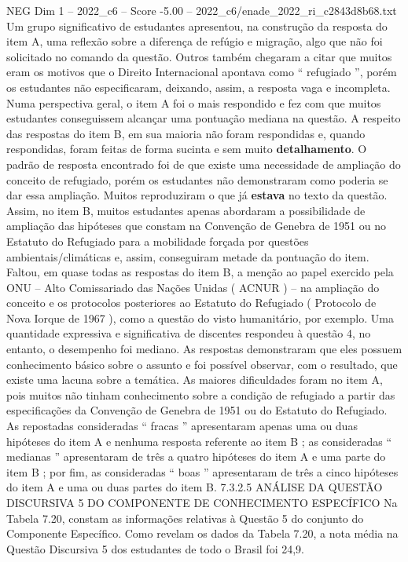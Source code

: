 \begin{textsample}{NEG Dim 1 – 2022\_c6 – Score -5.00 – 2022\_c6/enade\_2022\_ri\_c2843d8b68.txt}
Um grupo significativo de estudantes apresentou, na construção da resposta do item A, uma reflexão sobre a diferença de refúgio e migração, algo que não foi solicitado no comando da questão.
Outros também chegaram a citar que muitos eram os motivos que o Direito Internacional apontava como “ refugiado ”, porém os estudantes não especificaram, deixando, assim, a resposta vaga e incompleta.
Numa perspectiva geral, o item A foi o mais respondido e fez com que muitos estudantes conseguissem alcançar uma pontuação mediana na questão.
A respeito das respostas do item B, em sua maioria não foram respondidas e, quando respondidas, foram feitas de forma sucinta e sem muito \textbf{detalhamento}.
O padrão de resposta encontrado foi de que existe uma necessidade de ampliação do conceito de refugiado, porém os estudantes não demonstraram como poderia se dar essa ampliação.
Muitos reproduziram o que já \textbf{estava} no texto da questão.
Assim, no item B, muitos estudantes apenas abordaram a possibilidade de ampliação das hipóteses que constam na Convenção de Genebra de 1951 ou no Estatuto do Refugiado para a mobilidade forçada por questões ambientais/climáticas e, assim, conseguiram metade da pontuação do item.
Faltou, em quase todas as respostas do item B, a menção ao papel exercido pela ONU – Alto Comissariado das Nações Unidas ( ACNUR ) – na ampliação do conceito e os protocolos posteriores ao Estatuto do Refugiado ( Protocolo de Nova Iorque de 1967 ), como a questão do visto humanitário, por exemplo.
Uma quantidade expressiva e significativa de discentes respondeu à questão 4, no entanto, o desempenho foi mediano.
As respostas demonstraram que eles possuem conhecimento básico sobre o assunto e foi possível observar, com o resultado, que existe uma lacuna sobre a temática.
As maiores dificuldades foram no item A, pois muitos não tinham conhecimento sobre a condição de refugiado a partir das especificações da Convenção de Genebra de 1951 ou do Estatuto do Refugiado.
As repostadas consideradas “ fracas ” apresentaram apenas uma ou duas hipóteses do item A e nenhuma resposta referente ao item B ; as consideradas “ medianas ” apresentaram de três a quatro hipóteses do item A e uma parte do item B ; por fim, as consideradas “ boas ” apresentaram de três a cinco hipóteses do item A e uma ou duas partes do item B. 7.3.2.5 ANÁLISE DA QUESTÃO DISCURSIVA 5 DO COMPONENTE DE CONHECIMENTO ESPECÍFICO Na Tabela 7.20, constam as informações relativas à Questão 5 do conjunto do Componente Específico.
Como revelam os dados da Tabela 7.20, a nota média na Questão Discursiva 5 dos estudantes de todo o Brasil foi 24,9.

\end{textsample}
